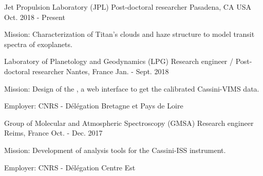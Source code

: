
\begin{cventries}

  \cventry
    {Jet Propulsion Laboratory (JPL)}
    {Post-doctoral researcher}
    {Pasadena, CA USA}
    {Oct. 2018 - Present}
    {
      \begin{cvitems}
        \item{Mission: Characterization of Titan's clouds and haze structure to model transit spectra of exoplanets.}
      \end{cvitems}
      \vspace{1em}
    }

  \cventry
    {Laboratory of Planetology and Geodynamics (LPG)}
    {Research engineer / Post-doctoral researcher}
    {Nantes, France}
    {Jan. - Sept. 2018}
    {
      \begin{cvitems}
        \item{Mission: Design of the
        ,
        a web interface to get the calibrated Cassini-VIMS data.}
        \item{Employer: CNRS - Délégation Bretagne et Pays de Loire}
      \end{cvitems}
      \vspace{1em}
    }

  \cventry
    {Group of Molecular and Atmospheric Spectroscopy (GMSA)}
    {Research engineer}
    {Reims, France}
    {Oct. - Dec. 2017}
    {
      \begin{cvitems}
        \item{Mission: Development of analysis tools for the Cassini-ISS instrument.}
        \item{Employer: CNRS - Délégation Centre Est}
      \end{cvitems}
      \vspace{1em}
    }

\end{cventries}

